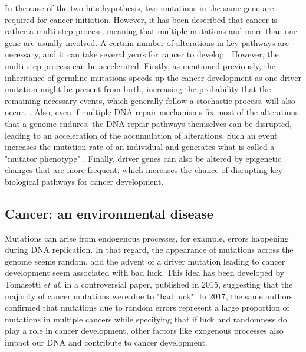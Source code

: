 In the case of the two hits hypothesis, two mutations in the same gene are required for cancer initiation. However, it has been described that cancer is rather a multi-step process, meaning that multiple mutations and more than one gene are usually involved. %
A certain number of alterations in key pathways are necessary, and it can take several years for cancer to develop \cite{Weinberg2014}. However, the multi-step process can be accelerated. Firstly, as mentioned previously, the inheritance of germline mutations speeds up the cancer development as one driver mutation might be present from birth, increasing the probability that the remaining necessary events, which generally follow a stochastic process, will also occur. %
\cite{Weinberg2014}. Also, even if multiple \gls*{DNA} repair mechanisms fix most of the alterations that a genome endures, the \gls*{DNA} repair pathways themselves can be disrupted, leading to an acceleration of the accumulation of alterations. Such an event increases the mutation rate of an individual and generates what is called a "mutator phenotype" \cite{Stratton2009,Loeb1991}. Finally, driver genes can also be altered by epigenetic changes that are more frequent, which increases the chance of disrupting key biological pathways for cancer development. 


\subsection{Cancer: an environmental disease}
Mutations can arise from endogenous processes, for example, errors happening during \gls*{DNA} replication. In that regard, the appearance of mutations across the genome seems random, and the advent of a driver mutation leading to cancer development seem associated with bad luck. This idea has been developed by Tomasetti \textit{et al.} \citep{Tomasetti2015} in a controversial paper, published in 2015, suggesting that the majority of cancer mutations were due to "bad luck". In 2017, the same authors confirmed that mutations due to random errors represent a large proportion of mutations in multiple cancers while specifying that if luck and randomness do play a role in cancer development, other factors like exogenous processes also impact our \gls*{DNA} and contribute to cancer development. \citep{Tomasetti2017}

